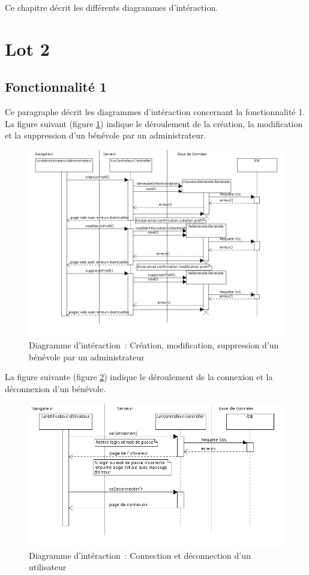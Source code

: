 Ce chapitre décrit les différents diagrammes d'intéraction.
\section{Lot 2}
\subsection{Fonctionnalité 1}
Ce paragraphe décrit les diagrammes d'intéraction concernant la fonctionnalité 1. \\

La figure suivant (figure \ref{diagrammeInteraction1}) indique le déroulement de la création, la modification et la suppression d'un bénévole par un administrateur.
\begin{figure}[H]
	\centering
	\includegraphics[scale=0.57]{../../lot2/DCP/images/diagrammesInteraction/01_diagrammeInteractionF1.png}
	\caption{Diagramme d'intéraction~: Création, modification, suppression d'un bénévole par un administrateur}
	\label{diagrammeInteraction1}
\end{figure}

La figure suivante (figure \ref{diagrammeInteraciton2}) indique le déroulement de la connexion et la déconnexion d'un bénévole.
\begin{figure}[H]
	\centering
	\includegraphics[scale=0.65]{../../lot2/DCP/images/diagrammesInteraction/02_diagrammeInteractionF1.png}
	\caption{Diagramme d'intéraction~: Connection et déconnection d'un utilisateur}
	\label{diagrammeInteraciton2}
\end{figure}

